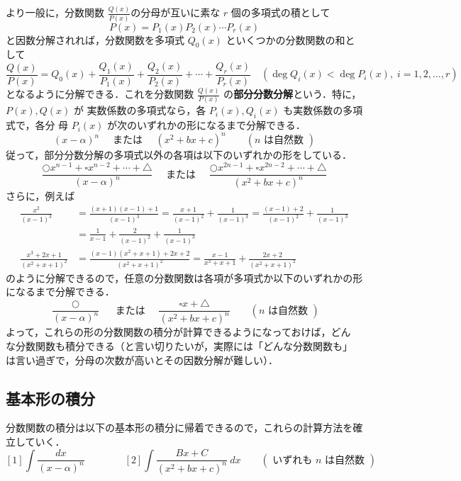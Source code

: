 \documentclass[10pt, uplatex, dvipdfmx]{jsarticle}
\theoremstyle{definition}
\numberwithin{equation}{section}
\newcommand{\ds}{\displaystyle}
\begin{document}
\newpage

より一般に，分数関数 $\ds \frac{Q(x)}{P(x)}$の分母が互いに素な $r$ 個の多項式の積として
\[
  P(x) = P_1(x)P_2(x) \cdots P_r(x)
\]
と因数分解されれば，分数関数を多項式 $Q_0(x)$ といくつかの分数関数の和として
\[
  \frac{Q(x)}{P(x)} = Q_0(x) + \frac{Q_1(x)}{P_1(x)} + \frac{Q_2(x)}{P_2(x)} +
  \cdots + \frac{Q_r(x)}{P_r(x)} \quad (\deg Q_i(x) < \deg P_i(x), \; i=1,2, \ldots, r)
\]
となるように分解できる．これを分数関数 $\ds
\frac{Q(x)}{P(x)}$ の\textbf{部分分数分解}という．特に，$P(x), Q(x)$ が
実数係数の多項式なら，各 $P_i(x), Q_i(x)$ も実数係数の多項式で，各分
母 $P_i(x)$ が次のいずれかの形になるまで分解できる．
\[
   (x-\alpha)^n \quad \text{ または } \quad (x^2+bx+c)^n \qquad (n \text{ は自然数 })
\]
従って，部分分数分解の多項式以外の各項は以下のいずれかの形をしている．
\[
  \frac{ \bigcirc x^{n-1} + \square x^{n-2} + \cdots + \triangle}{(x-\alpha)^n} \quad \text{ または } \quad
  \frac{\bigcirc x^{2n-1} + \square x^{2n-2} + \cdots + \triangle}{(x^2+bx+c)^n}
\]
さらに，例えば
\[
  \begin{aligned}
    \frac{x^2}{(x-1)^3}
    &= \frac{(x+1)(x-1)+1}{(x-1)^3} = \frac{x+1}{(x-1)^2} + \frac{1}{(x-1)^3}
      = \frac{(x-1)+2}{(x-1)^2} + \frac{1}{(x-1)^3} \\[1ex]
    &= \frac{1}{x-1} + \frac{2}{(x-1)^2} + \frac{1}{(x-1)^3}\\[5ex]
    \frac{x^3+2x+1}{(x^2+x+1)^2}
    &= \frac{(x-1)(x^2+x+1)+2x+2}{(x^2+x+1)^2} = \frac{x-1}{x^2+x+1} + \frac{2x+2}{(x^2+x+1)^2}
  \end{aligned}
\]
のように分解できるので，任意の分数関数は各項が多項式か以下のいずれかの形になるまで分解できる．
\begin{equation}\label{eq:basic-forms}
  \frac{\bigcirc}{(x-\alpha)^n} \quad \text{ または } \quad
  \frac{\square x + \bigtriangleup}{(x^2+bx+c)^n} \qquad (n \text{ は自然数 })
\end{equation}
よって，これらの形の分数関数の積分が計算できるようになっておけば，どん
な分数関数も積分できる（と言い切りたいが，実際には「どんな分数関数も」
は言い過ぎで，分母の次数が高いとその因数分解が難しい）．

\newpage

\subsection{基本形の積分}\label{subsec:basic}

分数関数の積分は以下の基本形の積分に帰着できるので，これらの計算方法を確立していく．
\[
  [1] \int\frac{dx}{(x-\alpha)^n} \qquad \qquad [2] \int \frac{Bx+C}{(x^2+bx+c)^n}\ dx \qquad
  ( \text{ いずれも $n$ は自然数 } )
\]
\end{document}
